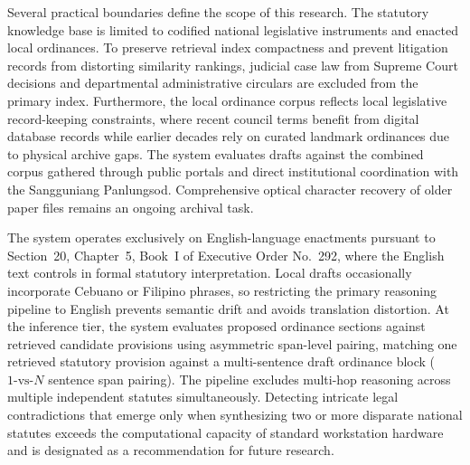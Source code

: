 Several practical boundaries define the scope of this research. The statutory knowledge base is limited to codified national legislative instruments and enacted local ordinances. To preserve retrieval index compactness and prevent litigation records from distorting similarity rankings, judicial case law from Supreme Court decisions and departmental administrative circulars are excluded from the primary index. Furthermore, the local ordinance corpus reflects local legislative record-keeping constraints, where recent council terms benefit from digital database records while earlier decades rely on curated landmark ordinances due to physical archive gaps. The system evaluates drafts against the combined corpus gathered through public portals and direct institutional coordination with the Sangguniang Panlungsod. Comprehensive optical character recovery of older paper files remains an ongoing archival task.

The system operates exclusively on English-language enactments pursuant to Section~20, Chapter~5, Book~I of Executive Order No.~292, where the English text controls in formal statutory interpretation. Local drafts occasionally incorporate Cebuano or Filipino phrases, so restricting the primary reasoning pipeline to English prevents semantic drift and avoids translation distortion. At the inference tier, the system evaluates proposed ordinance sections against retrieved candidate provisions using asymmetric span-level pairing, matching one retrieved statutory provision against a multi-sentence draft ordinance block ($1\text{-vs-}N$ sentence span pairing). The pipeline excludes multi-hop reasoning across multiple independent statutes simultaneously. Detecting intricate legal contradictions that emerge only when synthesizing two or more disparate national statutes exceeds the computational capacity of standard workstation hardware and is designated as a recommendation for future research.

